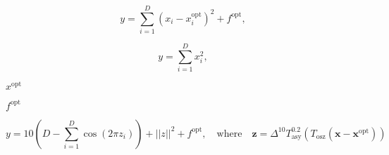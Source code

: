 \documentclass{article}
\begin{document}
\[y = \sum_{i=1}^D (x_i-x_i^{\mathrm{opt}})^2 + f^{\mathrm{opt}},\]
\pagebreak

\[y = \sum_{i=1}^D x_i^2,\]
\pagebreak

$x^{\mathrm{opt}}$
\pagebreak

$f^{\mathrm{opt}}$
\pagebreak

\[y = 10 \left( D - \sum_{i=1}^D \cos{(2 \pi z_i)} \right) + ||z||^2 + f^{\mathrm{opt}}, \quad \mathrm{where} \quad \mathbf{z} = \Delta^{10}T^{0.2}_{\mathrm{asy}}(T_{\mathrm{osz}}(\mathbf{x} - \mathbf{x}^{\mathrm{opt}}))\]
\pagebreak
\end{document}
